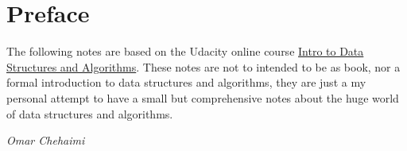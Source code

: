 \chapter*{Preface}

The following notes are based on the Udacity online course \href{https://www.udacity.com/course/data-structures-and-algorithms-in-python--ud513}{Intro to Data Structures and Algorithms}. These notes are not to intended to be as book, nor a formal introduction to data structures and algorithms, they are just a my personal attempt to have a small but comprehensive notes about the huge world of data structures and algorithms.
 
\begin{flushright}
	\textit{Omar Chehaimi}
\end{flushright}
